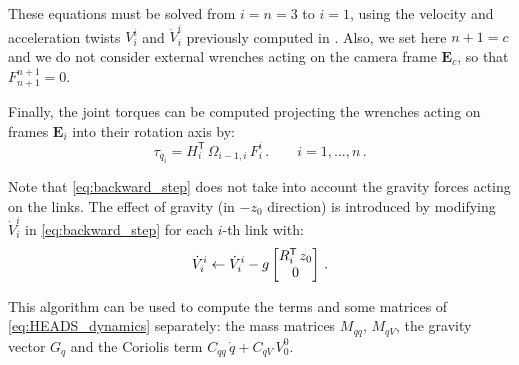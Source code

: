 \begin{algorithm}
These equations must be solved from $i=n=3$ to $i = 1$, using the velocity and acceleration twists $V^{i}_{i}$ and $\dot{V}^{i}_{i}$ 
previously computed in .
%
%
Also, we set here $n+1 = c$ and we do not consider external wrenches acting on the camera frame $\mathbf{E}_c$, so that $F^{n+1}_{n+1} = 0$.
%
\end{algorithm}

Finally, the joint torques can be computed projecting the wrenches acting on frames $\mathbf{E}_i$ into their rotation axis by:
%
\begin{equation}
\tau_{q_i} = H^\mathsf{T}_{i} \, \Omega_{i-1,i} \, F^{i}_{i} \,. \qquad i = 1,...,n \,.
\label{eq:joint_force_projection}
\end{equation}

Note that \eqref{eq:backward_step} does not take into account the gravity forces acting on the links. 
%
The effect of gravity (in $-z_0$ direction) is introduced by modifying $\dot{V}^i_{i}$ in \eqref{eq:backward_step} for each $i$-th link with:
%
\begin{equation}
\dot{V}^i_{i} \leftarrow \dot{V}^i_{i} - g \begin{bmatrix}R^\mathsf{T}_{i} \, z_0 \\ 0\end{bmatrix} \,.
\label{eq:gravity_effect}
\end{equation}

This algorithm can be used to compute the terms and some matrices of \eqref{eq:HEADS_dynamics} separately: the mass matrices $M_{qq}$, $M_{qV}$, the gravity vector $G_q$ and the Coriolis term $C_{qq} \, \dot{q} + C_{qV} \, V^0_{0}$.

